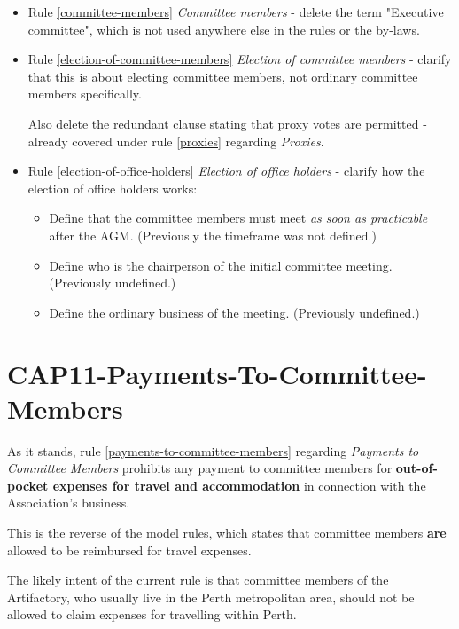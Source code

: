 \documentclass[../constitution.tex]{subfiles}
\begin{document}
\begin{itemize}


    \item Rule \ref{committee-members} \textit{Committee members} - delete the term "Executive committee", which is not used anywhere else in the rules or the by-laws.

    \item Rule \ref{election-of-committee-members} \textit{Election of committee members} - clarify that this is about electing committee members, not ordinary committee members specifically.

          Also delete the redundant clause stating that proxy votes are permitted - already covered under rule \ref{proxies} regarding \textit{Proxies}.

    \item Rule \ref{election-of-office-holders} \textit{Election of office holders} - clarify how the election of office holders works:

          \begin{itemize}
              \item Define that the committee members must meet \textit{as soon as practicable} after the AGM. (Previously the timeframe was not defined.)
              \item Define who is the chairperson of the initial committee meeting. (Previously undefined.)
              \item Define the ordinary business of the meeting. (Previously undefined.)
          \end{itemize}

\end{itemize}

\section*{CAP11-Payments-To-Committee-Members}

As it stands, rule \ref{payments-to-committee-members} regarding \textit{Payments to Committee Members} prohibits any payment to committee members for \textbf{out-of-pocket expenses for travel and accommodation} in connection with the Association's business.

This is the reverse of the model rules, which states that committee members \textbf{are} allowed to be reimbursed for travel expenses.

The likely intent of the current rule is that committee members of the Artifactory, who usually live in the Perth metropolitan area, should not be allowed to claim expenses for travelling within Perth.
\end{document}
